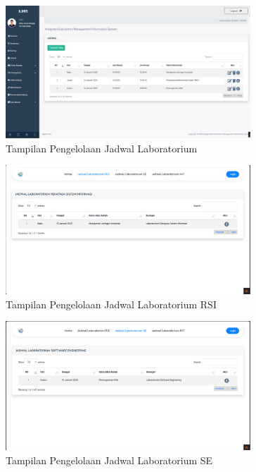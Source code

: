 \begin{figure}
	\centering
	\includegraphics[width=0.82\textwidth]{konten/gambar/hasil/jadwal.jpeg}
	\caption{Tampilan Pengelolaan Jadwal Laboratorium}
	\label{fig:jadwal-keseluruhan}
\end{figure}
\begin{figure}
	\centering
	\includegraphics[width=0.82\textwidth]{konten/gambar/hasil/labor-rsi.png}
	\caption{Tampilan Pengelolaan Jadwal Laboratorium RSI}
	\label{fig:jadwal-rsi}
\end{figure}
\begin{figure}
	\centering
	\includegraphics[width=0.82\textwidth]{konten/gambar/hasil/labor-se.png}
	\caption{Tampilan Pengelolaan Jadwal Laboratorium SE}
	\label{fig:jadwal-se}
\end{figure}
